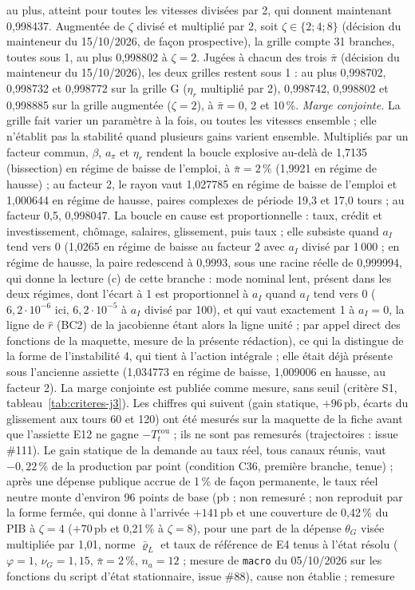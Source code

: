 \documentclass[11pt,a4paper]{article}
\newcommand{\barre}[1]{\leavevmode\sbox{\boitebarre}{#1}\rlap{\rule[0.6ex]{\wd\boitebarre}{0.4pt}}\usebox{\boitebarre}}
\begin{document}
\begin{proposee}
\barre{0,998883} au plus, atteint pour toutes les vitesses divisées par 2, qui donnent maintenant 0,998437. Augmentée de $\zeta$ divisé et multiplié par 2, soit $\zeta \in \{2 ; 4 ; 8\}$ (décision du mainteneur du 15/10/2026, de façon prospective), la grille compte 31 branches, toutes sous 1, au plus 0,998802 à $\zeta = 2$. Jugées à chacun des trois $\bar\pi$ (décision du mainteneur du 15/10/2026), les deux grilles restent sous 1 : au plus 0,998702, 0,998732 et 0,998772 sur la grille G ($\eta_r$ multiplié par 2), 0,998742, 0,998802 et 0,998885 sur la grille augmentée ($\zeta = 2$), à $\bar\pi = 0$, 2 et 10\,\%. \emph{Marge conjointe.} La grille fait varier un paramètre à la fois, ou toutes les vitesses ensemble ; elle n'établit pas la stabilité quand plusieurs gains varient ensemble. Multipliés par un facteur commun, $\beta$, $a_\pi$ et $\eta_r$ rendent la boucle explosive au-delà de 1,7135 (bissection) en régime de baisse de l'emploi, à $\bar\pi = 2\,\%$ (1,9921 en régime de hausse) ; au facteur 2, le rayon vaut 1,027785 en régime de baisse de l'emploi et 1,000644 en régime de hausse, paires complexes de période 19,3 et 17,0 tours ; au facteur 0,5, 0,998047. La boucle en cause est proportionnelle : taux, crédit et investissement, chômage, salaires, glissement, puis taux ; elle subsiste quand $a_I$ tend vers 0 (1,0265 en régime de baisse au facteur 2 avec $a_I$ divisé par 1\,000 ; en régime de hausse, la paire redescend à 0,9993, sous une racine réelle de 0,999994, qui donne la lecture (c) de cette branche : mode nominal lent, présent dans les deux régimes, dont l'écart à 1 est proportionnel à $a_I$ quand $a_I$ tend vers 0 ($6{,}2 \cdot 10^{-6}$ ici, $6{,}2 \cdot 10^{-5}$ à $a_I$ divisé par 100), et qui vaut exactement 1 à $a_I = 0$, la ligne de $\hat r$ (BC2) de la jacobienne étant alors la ligne unité ; par appel direct des fonctions de la maquette, mesure de la présente rédaction), ce qui la distingue de la forme de l'instabilité 4, qui tient à l'action intégrale ; elle était déjà présente sous l'ancienne assiette (1,034773 en régime de baisse, 1,009006 en hausse, au facteur 2). La marge conjointe est publiée comme mesure, sans seuil (critère S1, tableau~\ref{tab:criteres-j3}). Les chiffres qui suivent (gain statique, $+96$\,pb, écarts du glissement aux tours 60 et 120) ont été mesurés sur la maquette de la fiche avant que l'assiette E12 ne gagne $-T^{\mathrm{cou}}_t$ ; ils ne sont pas remesurés (trajectoires : issue \#111). Le gain statique de la demande au taux réel, tous canaux réunis, vaut $-0{,}22\,\%$ de la production par point (condition C36, première branche, tenue) ; après une dépense publique accrue de 1\,\% de façon permanente, le taux réel neutre monte d'environ 96 points de base (pb ; non remesuré ; non reproduit par la forme fermée, qui donne à l'arrivée $+141$\,pb et une couverture de 0,42\,\% du PIB à $\zeta = 4$ ($+70$\,pb et 0,21\,\% à $\zeta = 8$), pour une part de la dépense $\theta_G$ visée multipliée par 1,01, norme $\bar\varrho_L$ et taux de référence de E4 tenus à l'état résolu ($\varphi = 1$, $\nu_G = 1{,}15$, $\bar\pi = 2\,\%$, $n_a = 12$ ; mesure de \texttt{macro} du 05/10/2026 sur les fonctions du script d'état stationnaire, issue \#88), cause non établie ; remesure 
\end{proposee}
\end{document}
